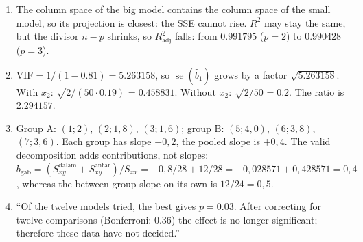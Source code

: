 \begin{enumerate}[label=\textbf{21.\arabic*}]
  \item The column space of the big model contains the column space of the small model, so
        its projection is closest: the SSE cannot rise. $R^{2}$ may stay the same, but the
        divisor $n-p$ shrinks, so $R^{2}_{\text{adj}}$ falls: from $0.991795$ ($p=2$) to
        $0.990428$ ($p=3$).

  \item $\mathrm{VIF}=1/(1-0.81)=5.263158$, so
        $\operatorname{se}(\hat b_{1})$ grows by a factor $\sqrt{5.263158}$. With
        $x_{2}$: $\sqrt{2/(50\cdot0.19)}=0.458831$. Without $x_{2}$:
        $\sqrt{2/50}=0.2$. The ratio is $2.294157$.

  \item 
Group A: $(1;2)$, $(2;1{,}8)$, $(3;1{,}6)$; group B: $(5;4{,}0)$,
        $(6;3{,}8)$, $(7;3{,}6)$. Each group has slope $-0{,}2$, the pooled slope is
        $+0{,}4$. The valid decomposition adds contributions, not slopes:
        $b_{\text{gab}}=(S_{xy}^{\text{dalam}}+S_{xy}^{\text{antar}})/S_{xx}=-0{,}8/28+12/28=-0{,}028571+0{,}428571=0{,}4$,
        whereas the between-group slope on its own is $12/24=0{,}5$.

  \item ``Of the twelve models tried, the best gives $p=0.03$. After
        correcting for twelve comparisons (Bonferroni: $0.36$) the effect is no longer
        significant; therefore these data have not decided.''
\end{enumerate}

